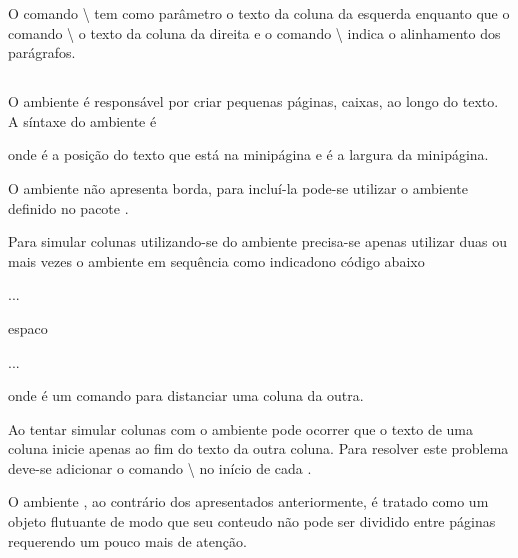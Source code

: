 O comando \textbackslash{} tem como parâmetro o texto da coluna da esquerda enquanto que o comando \textbackslash{} o texto da coluna da direita e o comando \textbackslash{} indica o alinhamento dos parágrafos.

\subsection{}
O ambiente  é responsável por criar pequenas páginas, caixas, ao longo do texto. A síntaxe do ambiente é
\begin{latexcode}
    \begin{minipage}[pos]{largura}
    \end{minipage}
\end{latexcode}
onde  é a posição do texto que está na minipágina e  é a largura da minipágina.

O ambiente  não apresenta borda, para incluí-la pode-se utilizar o ambiente  definido no pacote .

Para simular colunas utilizando-se do ambiente  precisa-se apenas utilizar duas ou mais vezes o ambiente em sequência como indicadono código abaixo
\begin{latexcode}
    \begin{minipage}[pos1]{largura1}
        ...
    \end{minipage} espaco
    \begin{minipage}[pos1]{largura1}
        ...
    \end{minipage}
\end{latexcode}
onde  é um comando para distanciar uma coluna da outra.

Ao tentar simular colunas com o ambiente  pode ocorrer que o texto de uma coluna inicie apenas ao fim do texto da outra coluna. Para resolver este problema deve-se adicionar o comando \textbackslash{} no início de cada .

O ambiente , ao contrário dos apresentados anteriormente, é tratado como um objeto flutuante de modo que seu conteudo não pode ser dividido entre páginas requerendo um pouco mais de atenção.
